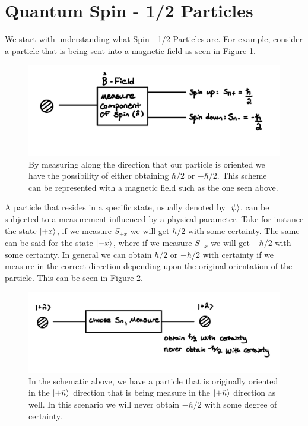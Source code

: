 \documentclass[twocolumn]{article}
\begin{document}
\section*{Quantum Spin - 1/2 Particles}
We start with understanding what Spin - 1/2 Particles are. For example, consider a particle that is being sent into a magnetic field as seen in Figure 1. 
\begin{figure}[htbp]
\begin{center}
\includegraphics[width=1.00\linewidth]{Spin-In-Magnetic-Field.jpg}
\caption{By measuring along the direction that our particle is oriented we have the possibility of either obtaining $\hbar/2$ or $-\hbar/2$. This scheme can be represented with a magnetic field such as the one seen above.}
\end{center}
\end{figure}
\newpage
A particle that resides in a specific state, usually denoted by $\ket{\psi}$, can be subjected to a measurement influenced by a physical parameter. Take for instance the state $\ket{+x}$, if we measure $S_{+x}$ we will get $\hbar/2$ with some certainty. The same can be said for the state $\ket{-x}$, where if we measure $S_{-x}$ we will get $-\hbar/2$ with some certainty. In general we can obtain $\hbar/2$ or $-\hbar/2$ with certainty if we measure in the correct direction depending upon the original orientation of the particle. This can be seen in Figure 2.
\begin{figure}[htbp]
\begin{center}
\includegraphics[width=1.00\linewidth]{Spin-With-Certainty.jpg}
\caption{In the schematic above, we have a particle that is originally oriented in the $\ket{+\hat{n}}$ direction that is being measure in the $\ket{+\hat{n}}$ direction as well. In this scenario we will never obtain $-\hbar/2$ with some degree of certainty.}
\end{center}
\end{figure}
\end{document}
